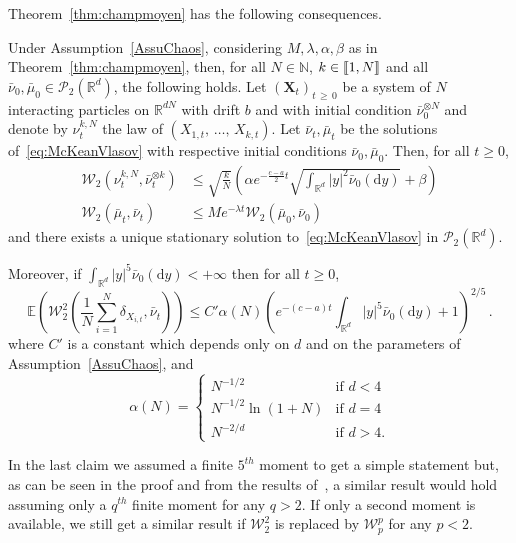 \documentclass[AHL,Unicode,longabstracts,published]{cedram}
\newcommand{\llbracket}{\mathopen{[\mkern -2.7mu[}}
\newcommand{\rrbracket}{\mathclose{]\mkern -2.7mu]}}
\newcommand{\R}{\mathbb R}
\newcommand{\bbE}{\mathbb E}
\newcommand{\clP}{\mathcal P}
\newcommand{\clW}{\mathcal W}
\newcommand{\N}{\mathbb N}
\newcommand{\dd}{\mathrm{d}}
\newcommand{\1}{\mathbbm{1}}
\newcommand{\bX}{\mathbf{X}}
\newcommand{\R}{\mathbb R}
\newcommand{\clW}{\mathcal W}
\begin{document}
Theorem~\ref{thm:champmoyen} has the following consequences.

\begin{coro}
Under Assumption~\ref{AssuChaos}, considering $M,\lambda,\alpha,\beta$ as in Theorem~\ref{thm:champmoyen}, then, for all $N\in \N$, $k\in\llbracket 1,N\rrbracket$ and all $\bar \nu_0,\bar \mu_0 \in \clP_2(\R^d)$, the following holds. Let $(\bX_t)_{t\,\geqslant\,0}$ be a system of $N$ interacting particles on $\R^{dN}$ with drift $b$ and with initial condition $\bar \nu_0^{\otimes N}$ and denote by $\nu_t^{k,N}$ the law of $(X_{1,t},\,\dots,\, X_{k,t})$. Let $\bar \nu_t,\bar \mu_t$ be the solutions of~\eqref{eq:McKeanVlasov} with respective initial conditions $\bar\nu_0,\bar\mu_0$. Then, for all $t\geqslant 0$,
\begin{align*}
\clW_2\left( \nu_t^{k,N},\bar \nu_t^{\otimes k}\right) &\leqslant \sqrt{\frac{k}{N}} \left( \alpha e^{-\frac{c-a}{2}t}\sqrt{\int_{\R^d} |y|^2 \bar \nu_0(\dd y)} + \beta\right) \\
\clW_2\left(\bar \mu_t,\bar \nu_t\right) &\leqslant M e^{-\lambda t} \clW_2\left(\bar \mu_0,\bar \nu_0\right)
\end{align*}
and there exists a unique stationary solution to~\eqref{eq:McKeanVlasov} in $\clP_2(\R^d)$.

Moreover, if $\int_{\R^d} |y|^5 \bar \nu_0(\dd y)<+\infty$ then for all $t\geqslant 0$,
\[
\bbE \left( \clW_2^2 \left( \frac1N \sum_{i=1}^N \delta_{X_{i,t}}, \bar\nu_t\right) \right) \leqslant C'\alpha(N)\left( e^{-(c-a)t}\int_{\R^d} |y|^5 \bar \nu_0(\dd y) + 1\right)^{2/5}\,.
\]
where $C'$ is a constant which depends only on $d$ and on the parameters of Assumption~\ref{AssuChaos}, and
\[
\alpha(N) = \left\{
\begin{array}{ll}
N^{-1/2} & \text{if } d<4\\
N^{-1/2}\ln(1+N) & \text{if }d=4\\
N^{-2/d} & \text{if }d>4.
\end{array}\right.
\]
\end{coro}

In the last claim we assumed a finite $5^{th}$ moment to get a simple statement but, as can be seen in the proof and from the results of~\cite{FournierGuillin}, a similar result would hold assuming only a $q^{th}$ finite moment for any $q>2$. If only a second moment is available, we still get a similar result if $\clW_2^2$ is replaced by $\clW_p^p$ for any $p<2$.
\end{document}

